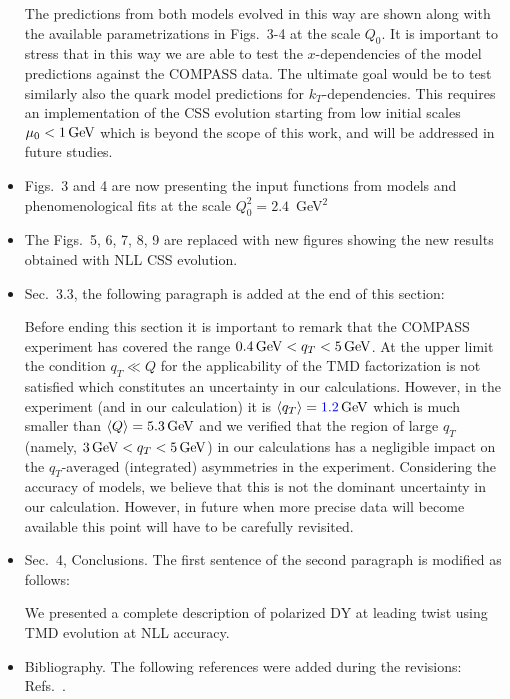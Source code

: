 \documentclass[a4paper]{article}
\newcommand{\bakur}[1]{{\color{blue}#1}}
\newcommand{\comment}[1]{{\color{blue}#1}}
\begin{document}
\begin{itemize}
{The predictions from both models evolved in this way 
are shown along with the available parametrizations in
Figs.~3-4 at the scale $Q_0$. 
It is important to stress that in this way we are able to test the
$x$-dependencies of the model predictions against the COMPASS data. 
The ultimate goal would be to test similarly also the quark model 
predictions for $k_T$-dependencies. This requires an implementation of 
the CSS evolution starting from low initial scales $\mu_0< 1\,{\rm GeV}$
which is beyond the scope of this work, and will be addressed in future studies.} 


\item\comment{Figs.~3 and 4 are now presenting the input functions from models and phenomenological fits at the scale $Q_0^2=2.4$~GeV$^2$} 

\item\comment{The Figs.~5, 6, 7, 8, 9 are replaced with new 
figures showing the new results obtained with NLL CSS evolution.}


\item\comment{Sec.~3.3, the following paragraph is added at the 
end of this section:}

Before ending this section it is important to remark that the COMPASS
experiment has covered the range $0.4\,{\rm GeV} < q_T < 5\,{\rm GeV}$. 
At the upper limit the condition $q_T \ll  Q$ for
the applicability of the TMD factorization is not satisfied which 
constitutes an  uncertainty in our calculations.
However, in the experiment (and in our calculation) it is 
$\langle q_T\rangle = \bakur{1.2} \,{\rm GeV}$ which is much smaller 
than $\langle Q \rangle = 5.3\,{\rm GeV}$ and we verified that 
the region of large $q_T$ (namely, $3\,{\rm GeV} < q_T < 5\,{\rm GeV}$) 
in our calculations has a negligible impact on
the $q_T$-averaged (integrated) asymmetries in the experiment.
Considering the accuracy of models, we believe that this is not 
the dominant uncertainty in our calculation. However, in future 
when more precise data will become available this point will have
to be carefully revisited.


\item\comment{Sec.~4, Conclusions. The first sentence of the
second paragraph is modified as follows:}

We presented a complete description of polarized DY at leading twist using TMD evolution at NLL accuracy. 


\item\comment{Bibliography. 
The following references were added during the revisions:}
 Refs.~\cite{Gehrmann:2014yya,Echevarria:2015byo,Echevarria:2015usa,Echevarria:2016scs,Li:2016ctv,Vladimirov:2016dll,Luo:2019hmp,Luo:2019szz,Ebert:2020yqt,Gutierrez-Reyes:2017glx,Gutierrez-Reyes:2018iod,Ji:2006ub,Koike:2007dg,Sun:2013hua,Dai:2014ala,Scimemi:2019gge,Collins:1981va,Aybat:2011zv,Angeles-Martinez:2015sea,Ebert:2020dfc,Scimemi:2018xaf,DAlesio:2004eso,Efremov:2010mt,Schweitzer:2012hh,Boer:2011xd,Bacchetta:2019qkv,Qiu:2000ga,Moch:2005id,Kang:2011mr,Echevarria:2012pw,Grozin:2014hna,Collins:2017oxh,Pasquini:2007iz,Traini:1997jz,Moos:2020wvd,Su:2014wpa,Kang:2015msa,Kang:2014zza,Bacchetta:2017gcc}.


\end{itemize}
\end{document}
